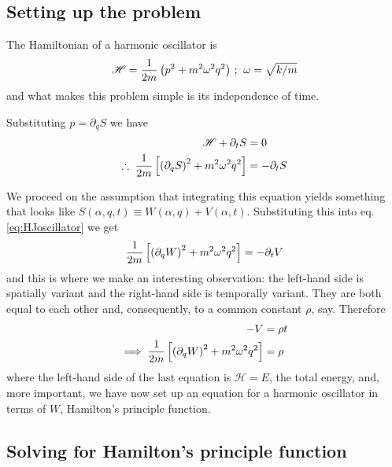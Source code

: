 \documentclass[english,seminar,headertitle]{lecture}
\newcommand{\ham}{\mathscr{H}}
\begin{document}
\subsection{Setting up the problem}

The Hamiltonian of a harmonic oscillator is $$\ham = {1\over 2m} \left( p^2 + m^2\omega^2q^2 \right) \,\textrm{;}\;\; \omega = \sqrt{k/m}$$and what makes this problem simple is its independence of time.

Substituting $p = \partial_q S$ we have \begin{align}\ham + \partial_t S &= 0 \nonumber\\ \therefore\; {1\over 2m} \left[ \left(\partial_q S\right)^2 + m^2\omega^2q^2 \right] &= - \partial_t S \label{eq:HJoscillator} \end{align}

We proceed on the assumption that integrating this equation yields something that looks like $S(\alpha, q, t) \equiv W(\alpha, q) + V(\alpha, t)$. Substituting this into eq. \eqref{eq:HJoscillator} we get $${1\over 2m} \left[ \left(\partial_q W\right)^2 + m^2\omega^2q^2 \right] = - \partial_t V$$and this is where we make an interesting observation: the left-hand side is spatially variant and the right-hand side is temporally variant. They are both equal to each other and, consequently, to a common constant $\rho$, say. Therefore
\begin{align}
-V &= \rho t \nonumber\\
\implies {1\over 2m} \left[ \left(\partial_q W\right)^2 + m^2\omega^2q^2 \right] &= \rho \label{eq:oscillatorW}
\end{align}where the left-hand side of the last equation is $\ham = E$, the total energy, and, more important, we have now set up an equation for a harmonic oscillator in terms of $W$, Hamilton's principle function.

\subsection{Solving for Hamilton's principle function}
\end{document}
